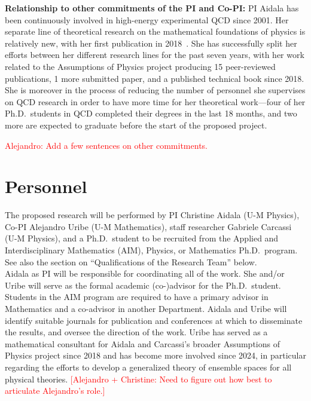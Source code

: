 \noindent
\textbf{Relationship to other commitments of the PI and Co-PI:} PI Aidala has been continuously involved in high-energy experimental QCD since 2001.  Her separate line of theoretical research on the mathematical foundations of physics is relatively new, with her first publication in 2018~\cite{aop-phys-blueprint}. She has successfully split her efforts between her different research lines for the past seven years, with her work related to the Assumptions of Physics project producing 15 peer-reviewed publications, 1 more submitted paper, and a published technical book since 2018.  She is moreover in the process of reducing the number of personnel she supervises on QCD research in order to have more time for her theoretical work---four of her Ph.D.~students in QCD completed their degrees in the last 18 months, and two more are expected to graduate before the start of the proposed project.  


\textcolor{red}{Alejandro: Add a few sentences on other commitments.}




\section{Personnel}
The proposed research will be performed by PI Christine Aidala (U-M Physics), Co-PI Alejandro Uribe (U-M Mathematics), staff researcher Gabriele Carcassi (U-M Physics), and a Ph.D.~student to be recruited from the Applied and Interdisciplinary Mathematics (AIM), Physics, or Mathematics Ph.D.~program.  See also the section on ``Qualifications of the Research Team'' below.  \\

Aidala as PI will be responsible for coordinating all of the work.  She and/or Uribe will serve as the formal academic (co-)advisor for the Ph.D.~student.  Students in the AIM program are required to have a primary advisor in Mathematics and a co-advisor in another Department.  Aidala and Uribe will identify suitable journals for publication and conferences at which to disseminate the results, and oversee the direction of the work.  Uribe has served as a mathematical consultant for Aidala and Carcassi's broader Assumptions of Physics project since 2018 and has become more involved since 2024, in particular regarding the efforts to develop a generalized theory of ensemble spaces for all physical theories. \textcolor{red}{[Alejandro + Christine: Need to figure out how best to articulate Alejandro's role.]}

